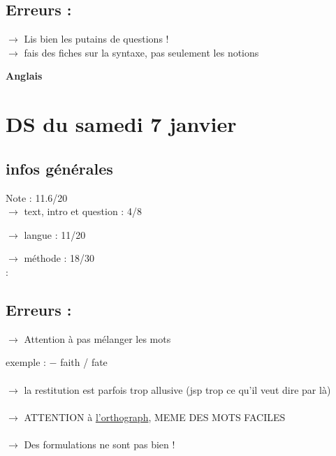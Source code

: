 \documentclass{book}
\begin{document}
\subsection{Erreurs :}

$\rightarrow$ Lis bien les putains de questions ! \\
$\rightarrow$ fais des fiches sur la syntaxe, pas seulement les notions \\

\begin{center}
\textbf{\large Anglais}
\end{center}

\vspace{0.6cm}

\section{DS du samedi 7 janvier}

\begin{tcolorbox}[width={14cm},colback={yellow!20!white},title={\textbf{Commentaire générale sur ce DM}},colbacktitle=red!40!white,coltitle=black]    

\end{tcolorbox}

\subsection{infos générales}

Note : 11.6/20 \\

$\rightarrow$ text, intro et question : 4/8

$\rightarrow$ langue : 11/20

$\rightarrow$ méthode : 18/30 \\:


\subsection{Erreurs :}

$\rightarrow$ Attention à pas mélanger les mots

exemple : $-$ faith / fate \\ \\
$\rightarrow$ la restitution est parfois trop allusive (jsp trop ce qu'il veut dire par là) \\ \\
$\rightarrow$ ATTENTION à \underline{l'orthograph}, MEME DES MOTS FACILES \\ \\
$\rightarrow$ Des formulations ne sont pas bien !
\end{document}
